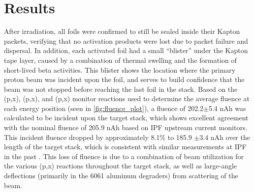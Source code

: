 \documentclass[3p]{elsarticle}
\begin{document}
% 




\section{Results}


After irradiation, all foils were confirmed to still be sealed inside their Kapton packets, verifying that no activation products were lost due to packet failure and dispersal.
In addition, each activated foil had a small \enquote{blister} under the Kapton tape layer, caused by a combination of thermal swelling and the formation of short-lived beta activities.
This blister   shows the location where the primary proton beam was incident upon the foil, and serves to build confidence that the beam was not stopped before reaching the last foil in the stack.
Based on the (p,x), (p,x), and (p,x) monitor reactions used to determine the average fluence at each energy position (seen in \autoref{fig:fluence_plot}), a fluence of 202.2$\pm$5.4 nAh was calculated to be incident upon the target stack, which shows excellent agreement with the nominal fluence of 205.9 nAh based on IPF upstream current monitors.
This incident fluence dropped by approximately 8.1\% to  185.9 $\pm$3.4 nAh over the length of the target stack, which is consistent with similar measurements at IPF in the past \cite{Graves2016}.
This loss of fluence is due to a combination of beam utilization for the various (p,x) reactions throughout the target stack, as well as large-angle deflections (primarily in the 6061 aluminum degraders) from scattering of the beam.
\end{document}
